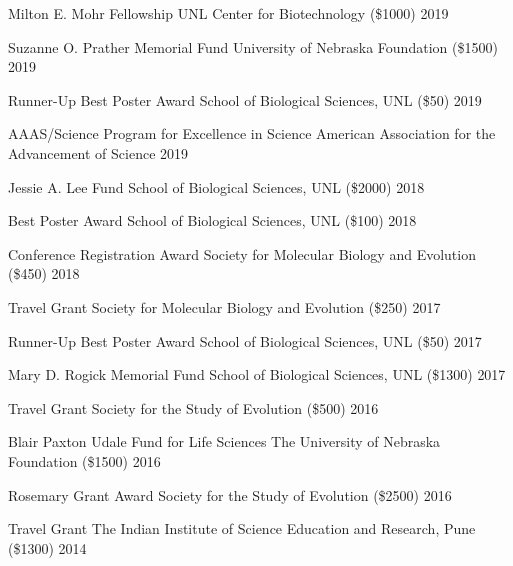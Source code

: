 
\begin{cvhonors}

  \cvhonor
    {Milton E. Mohr Fellowship}
    {UNL Center for Biotechnology (\$1000)}
    {2019}
    {}

  \cvhonor
    {Suzanne O. Prather Memorial Fund}
    {University of Nebraska Foundation (\$1500)}
    {2019}
    {}

  \cvhonor
    {Runner-Up Best Poster Award}
    {School of Biological Sciences, UNL (\$50)}
    {2019}
    {}

  \cvhonor
    {AAAS/Science Program for Excellence in Science}
    {American Association for the Advancement of Science}
    {2019}
    {}

  \cvhonor
    {Jessie A. Lee Fund} 
    {School of Biological Sciences, UNL (\$2000)}
    {2018} %
    {}

  \cvhonor
    {Best Poster Award}
    {School of Biological Sciences, UNL (\$100)}
    {2018}
    {}

  \cvhonor
    {Conference Registration Award}
    {Society for Molecular Biology and Evolution (\$450)}
    {2018}
    {}

  \cvhonor
    {Travel Grant}
    {Society for Molecular Biology and Evolution (\$250)}
    {2017}
    {}

  \cvhonor
    {Runner-Up Best Poster Award}
    {School of Biological Sciences, UNL (\$50)}
    {2017}
    {}

  \cvhonor
    {Mary D. Rogick Memorial Fund}
    {School of Biological Sciences, UNL (\$1300)}
    {2017}
    {}

  \cvhonor
    {Travel Grant}
    {Society for the Study of Evolution (\$500)}
    {2016}
    {}

  \cvhonor
    {Blair Paxton Udale Fund for Life Sciences}
    {The University of Nebraska Foundation (\$1500)}
    {2016}
    {}

  \cvhonor
    {Rosemary Grant Award}
    {Society for the Study of Evolution (\$2500)}
    {2016}
    {}

  \cvhonor
    {Travel Grant}
    {The Indian Institute of Science Education and Research, Pune (\$1300)}
    {2014}
    {}


\end{cvhonors}
